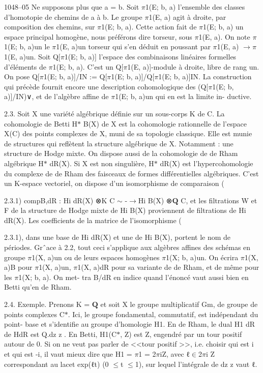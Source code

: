 \documentclass[11pt]{article}
\begin{document}
1048--05 Ne supposons plus que a = b. Soit \(\pi\)1(E; b, a) l’ensemble des classes d’homotopie de chemins de a à b. Le groupe \(\pi\)1(E, a) agit à droite, par composition des chemins, sur \(\pi\)1(E; b, a). Cette action fait de \(\pi\)1(E; b, a) un espace principal homogène, nous préférons dire torseur, sous \(\pi\)1(E, a). On note \(\pi\)1(E; b, a)un le \(\pi\)1(E, a)un torseur qui s’en déduit en poussant par \(\pi\)1(E, a) \(\to\)\(\pi\)1(E, a)un. Soit Q[\(\pi\)1(E; b, a)] l’espace des combinaisons linéaires formelles d’éléments de \(\pi\)1(E; b, a). C’est un Q[\(\pi\)1(E, a)]-module à droite, libre de rang un. On pose Q[\(\pi\)1(E; b, a)]/IN := Q[\(\pi\)1(E; b, a)]/Q[\(\pi\)1(E; b, a)]IN. La construction qui précède fournit encore une description cohomologique des (Q[\(\pi\)1(E; b, a)]/IN)∨, et de l’algèbre affine de \(\pi\)1(E; b, a)un qui en est la limite in- ductive. 

2.3. Soit X une variété algébrique définie sur un sous-corps K de C. La cohomologie de Betti H\(*\) B(X) de X est la cohomologie rationnelle de l’espace X(C) des points complexes de X, muni de sa topologie classique. Elle est munie de structures qui reflètent la structure algébrique de X. Notamment : une structure de Hodge mixte. On dispose aussi de la cohomologie de de Rham algébrique H\(*\) dR(X). Si X est non singulière, H\(*\) dR(X) est l’hypercohomologie du complexe de de Rham des faisceaux de formes différentielles algébriques. C’est un K-espace vectoriel, on dispose d’un isomorphisme de comparaison (

2.3.1) compB,dR : Hi dR(X) ⊗K C \(\sim\) -\(\to\)Hi B(X) ⊗\(\mathbf Q\) C, et les filtrations W et F de la structure de Hodge mixte de Hi B(X) proviennent de filtrations de Hi dR(X). Les coefficients de la matrice de l’isomorphisme (

2.3.1), dans une base de Hi dR(X) et une de Hi B(X), portent le nom de périodes. Grˆace à 2.2, tout ceci s’applique aux algèbres affines des schémas en groupe \(\pi\)1(X, a)un ou de leurs espaces homogènes \(\pi\)1(X; b, a)un. On écrira \(\pi\)1(X, a)B pour \(\pi\)1(X, a)un, \(\pi\)1(X, a)dR pour sa variante de de Rham, et de même pour les \(\pi\)1(X; b, a). On met- tra B/dR en indice quand l’énoncé vaut aussi bien en Betti qu’en de Rham. 

2.4. Exemple. Prenons K = \(\mathbf Q\) et soit X le groupe multiplicatif Gm, de groupe de points complexes C\(*\). Ici, le groupe fondamental, commutatif, est indépendant du point- base et s’identifie au groupe d’homologie H1. En de Rham, le dual H1 dR de HdR est Q.dz z . En Betti, H1(C\(*\), Z) est Z, engendré par un tour positif autour de 0. Si on ne veut pas parler de <<tour positif >>, i.e. choisir qui est i et qui est -i, il vaut mieux dire que H1 = \(\pi\)1 = 2\(\pi\)iZ, avec ℓ\(\in\)2\(\pi\)i Z correspondant au lacet exp(ℓt) (0 \(\le\)t \(\le\)1), sur lequel l’intégrale de dz z vaut ℓ.
\end{document}
